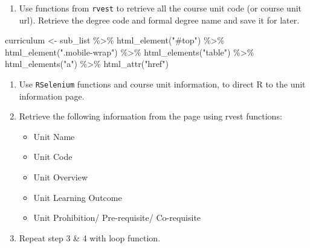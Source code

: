 \documentclass[
  letterpaper,
]{report}
\newenvironment{Shaded}{\begin{snugshade}}{\end{snugshade}}
\newcommand{\FunctionTok}[1]{\textcolor[rgb]{0.28,0.35,0.67}{#1}}
\newcommand{\NormalTok}[1]{\textcolor[rgb]{0.00,0.23,0.31}{#1}}
\newcommand{\OtherTok}[1]{\textcolor[rgb]{0.00,0.23,0.31}{#1}}
\newcommand{\SpecialCharTok}[1]{\textcolor[rgb]{0.37,0.37,0.37}{#1}}
\newcommand{\StringTok}[1]{\textcolor[rgb]{0.13,0.47,0.30}{#1}}
\providecommand{\tightlist}{%
  \setlength{\itemsep}{0pt}\setlength{\parskip}{0pt}}\usepackage{longtable,booktabs,array}
\begin{document}
\begin{enumerate}
\def\labelenumi{\arabic{enumi}.}
\setcounter{enumi}{1}
\tightlist
\item
  Use functions from \texttt{rvest} to retrieve all the course unit code
  (or course unit url). Retrieve the degree code and formal degree name
  and save it for later.
\end{enumerate}

\begin{Shaded}
\begin{Highlighting}[]
\NormalTok{curriculum }\OtherTok{\textless{}{-}}\NormalTok{ sub\_list }\SpecialCharTok{\%\textgreater{}\%} 
      \FunctionTok{html\_element}\NormalTok{(}\StringTok{"\#top"}\NormalTok{) }\SpecialCharTok{\%\textgreater{}\%} 
      \FunctionTok{html\_element}\NormalTok{(}\StringTok{".mobile{-}wrap"}\NormalTok{) }\SpecialCharTok{\%\textgreater{}\%} 
      \FunctionTok{html\_elements}\NormalTok{(}\StringTok{"table"}\NormalTok{) }\SpecialCharTok{\%\textgreater{}\%} 
      \FunctionTok{html\_elements}\NormalTok{(}\StringTok{"a"}\NormalTok{) }\SpecialCharTok{\%\textgreater{}\%} 
      \FunctionTok{html\_attr}\NormalTok{(}\StringTok{"href"}\NormalTok{)}
\end{Highlighting}
\end{Shaded}

\begin{enumerate}
\def\labelenumi{\arabic{enumi}.}
\setcounter{enumi}{2}
\item
  Use \texttt{RSelenium} functions and course unit information, to
  direct R to the unit information page.
\item
  Retrieve the following information from the page using rvest
  functions:

  \begin{itemize}
  \tightlist
  \item
    Unit Name
  \item
    Unit Code
  \item
    Unit Overview
  \item
    Unit Learning Outcome
  \item
    Unit Prohibition/ Pre-requisite/ Co-requisite
  \end{itemize}
\item
  Repeat step 3 \& 4 with loop function.
\end{enumerate}
\end{document}
